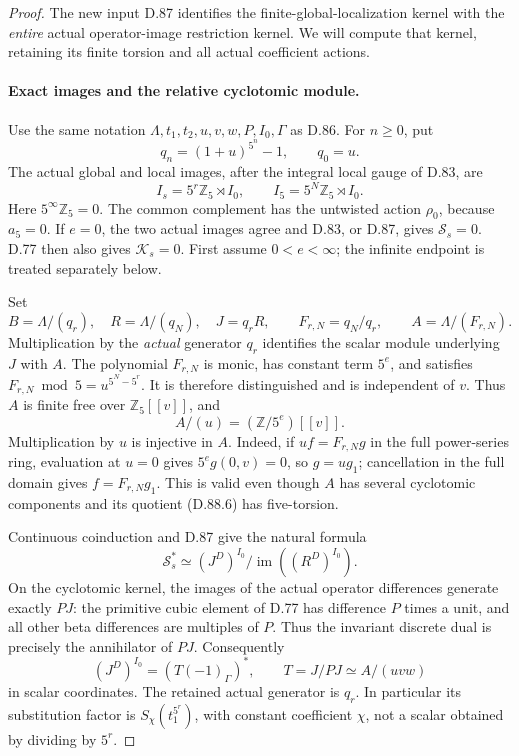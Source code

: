 \begin{proof}
The new input D.87 identifies the finite-global-localization
kernel with the \emph{entire} actual operator-image restriction
kernel. We will compute that kernel, retaining its finite
torsion and all actual coefficient actions.

\paragraph{Exact images and the relative cyclotomic module.}
Use the same notation \(\Lambda,t_1,t_2,u,v,w,P,I_0,\Gamma\)
as D.86. For \(n\ge0\), put
\[
                     q_n=(1+u)^{5^n}-1,
                     \qquad q_0=u.
\]
The actual global and local images, after the integral local
gauge of D.83, are
\[
 I_s=5^r\mathbb Z_5\rtimes I_0,
       \qquad I_5=5^N\mathbb Z_5\rtimes I_0.           \tag{D.88.4}
\]
Here \(5^\infty\mathbb Z_5=0\).
The common complement has the untwisted action \(\rho_0\),
because \(a_5=0\). If \(e=0\), the two actual images agree
and D.83, or D.87, gives \(\mathcal S_s=0\). D.77 then
also gives \(\mathcal K_s=0\). First assume \(0<e<\infty\);
the infinite endpoint is treated separately below.

Set
\[
 B=\Lambda/(q_r),\quad R=\Lambda/(q_N),\quad J=q_rR,
 \qquad F_{r,N}=q_N/q_r,
 \qquad A=\Lambda/(F_{r,N}).                           \tag{D.88.5}
\]
Multiplication by the \emph{actual} generator \(q_r\)
identifies the scalar module underlying \(J\) with \(A\).
The polynomial \(F_{r,N}\) is monic, has constant term
\(5^e\), and satisfies
\(F_{r,N}\bmod5=u^{5^N-5^r}\). It is therefore
distinguished and is independent of \(v\). Thus \(A\) is
finite free over \(\mathbb Z_5[[v]]\), and
\[
                     A/(u)=(\mathbb Z/5^e)[[v]].       \tag{D.88.6}
\]
Multiplication by \(u\) is injective in \(A\). Indeed,
if \(uf=F_{r,N}g\) in the full power-series ring, evaluation
at \(u=0\) gives \(5^e g(0,v)=0\), so \(g=ug_1\);
cancellation in the full domain gives \(f=F_{r,N}g_1\).
This is valid even though \(A\) has several cyclotomic
components and its quotient (D.88.6) has five-torsion.

Continuous coinduction and D.87 give the natural formula
\[
 \mathcal S_s^*\simeq
       (J^D)^{I_0}/\operatorname{im}((R^D)^{I_0}).       \tag{D.88.7}
\]
On the cyclotomic kernel, the images of the actual operator
differences generate exactly \(PJ\): the primitive cubic
element of D.77 has difference \(P\) times a unit, and all
other beta differences are multiples of \(P\). Thus the
invariant discrete dual is precisely the annihilator of
\(PJ\). Consequently
\[
 (J^D)^{I_0}=(T(-1)_\Gamma)^*,\qquad
             T=J/PJ\simeq A/(uvw)                    \tag{D.88.8}
\]
in scalar coordinates. The retained actual generator is
\(q_r\). In particular its substitution factor is
\(S_\chi(t_1^{5^r})\), with constant coefficient \(\chi\),
not a scalar obtained by dividing by \(5^r\).


\end{proof}
